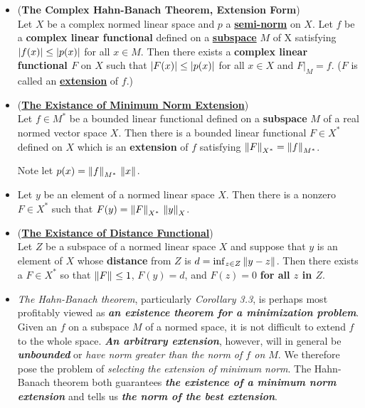 \documentclass[11pt]{article}
\begin{document}
\begin{itemize}
\item \begin{theorem} (\textbf{The Complex Hahn-Banach Theorem, Extension Form}) \citep{kreyszig1989introductory, reed1980methods, luenberger1997optimization, folland2013real}\\
Let $X$ be a complex normed linear space and $p$ a \underline{\textbf{semi-norm}} on $X$. Let $f$ be a \textbf{complex linear functional} defined on a \underline{\textbf{subspace}} $M$ of X satisfying $\left\lvert f(x) \right\rvert \le \left\lvert p(x) \right\rvert$ for all $x \in M$. Then there exists a \textbf{complex linear functional $F$} on $X$ such that $\left\lvert F(x) \right\rvert \le \left\lvert p(x) \right\rvert$  for all $x \in X$ and $F|_{M} = f$. ($F$ is called an \underline{\textbf{extension}} of $f$.) 
\end{theorem}

\item \begin{corollary} (\underline{\textbf{The Existance of Minimum Norm Extension}})\\
Let $f \in M^{*}$ be a bounded linear functional defined on a \textbf{subspace} $M$ of a real normed vector space $X$. Then there is a bounded linear functional
$F \in X^{*}$ defined on $X$ which is an \textbf{extension} of $f$ satisfying $\left\|F\right\|_{X^{*}} = \left\|f\right\|_{M^{*}}$.
\end{corollary} 
Note let $p(x) = \left\|f\right\|_{M^{*}}\,\left\|x\right\|_{}$.

\item \begin{corollary}
Let $y$ be an element of a normed linear space $X$. Then there is a nonzero $F \in X^{*}$ such that $F(y) = \left\|F\right\|_{X^{*}}\,\left\|y\right\|_{X}$.
\end{corollary}

\item \begin{corollary}(\underline{\textbf{The Existance of Distance Functional}})\\
Let $Z$ be a subspace of a normed linear space $X$ and suppose that $y$ is an element of $X$ whose \textbf{distance} from $Z$ is $d = \inf_{z \in Z}\left\|y -z\right\|_{}$. Then there
exists a $F \in X^{*}$ so that $\left\|F\right\|_{} \le 1$, $F(y) = d$, and $F(z) = 0$ \textbf{for all $z$ in $Z$}.
\end{corollary}

\item \begin{remark}
\emph{The Hahn-Banach theorem}, particularly \emph{Corollary 3.3}, is perhaps most profitably viewed as \emph{\textbf{an existence theorem for a minimization problem}}. Given an $f$ on a subspace $M$ of a normed space, it is not difficult to extend $f$ to the whole space. \emph{\textbf{An arbitrary extension}}, however, will in general be \emph{\textbf{unbounded}} or \emph{have norm greater than the norm of $f$ on $M$}. We therefore pose the problem of \emph{selecting the extension of minimum norm}. The Hahn-Banach theorem both guarantees \emph{\textbf{the existence of a minimum norm extension}} and tells us \emph{\textbf{the norm of the best extension}}.
\end{remark}


\end{itemize}
\end{document}

